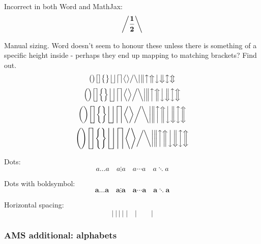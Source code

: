\documentclass[12pt,a4paper]{article}
\theoremstyle{clearprint}
\begin{document}
Incorrect in both Word and MathJax:
\begin{equation}
\boldsymbol{\left/ \frac{1}{2} \right\backslash} 
\end{equation}

Manual sizing. Word doesn't seem to honour these unless there is something of a specific height inside - perhaps they end up mapping to matching brackets? Find out.
\begin{equation}
\big( \big) \big[ \big] \big\{ \big\} \big\lfloor \big\rfloor \big\lceil \big\rceil \big\langle \big\rangle 
\big/ \big\backslash \big| \big\| \big\uparrow \big\Uparrow \big\downarrow \big\Downarrow \big\updownarrow \big\Updownarrow
\end{equation}
\begin{equation}
\Big( \Big) \Big[ \Big] \Big\{ \Big\} \Big\lfloor \Big\rfloor \Big\lceil \Big\rceil \Big\langle \Big\rangle 
\Big/ \Big\backslash \Big| \Big\| \Big\uparrow \Big\Uparrow \Big\downarrow \Big\Downarrow \Big\updownarrow \Big\Updownarrow
\end{equation}
\begin{equation}
\bigg( \bigg) \bigg[ \bigg] \bigg\{ \bigg\} \bigg\lfloor \bigg\rfloor \bigg\lceil \bigg\rceil \bigg\langle \bigg\rangle 
\bigg/ \bigg\backslash \bigg| \bigg\| \bigg\uparrow \bigg\Uparrow \bigg\downarrow \bigg\Downarrow \bigg\updownarrow \bigg\Updownarrow
\end{equation}
\begin{equation}
\Bigg( \Bigg) \Bigg[ \Bigg] \Bigg\{ \Bigg\} \Bigg\lfloor \Bigg\rfloor \Bigg\lceil \Bigg\rceil \Bigg\langle \Bigg\rangle 
\bigg/ \bigg\backslash \bigg| \bigg\| \bigg\uparrow \bigg\Uparrow \bigg\downarrow \bigg\Downarrow \bigg\updownarrow \bigg\Updownarrow
\end{equation}

\noindent 
Dots:
\begin{equation}
a \ldots a \quad a \vdots a \quad  a \cdots a \quad  a \ddots a
\end{equation}

\noindent 
Dots with boldsymbol:
\begin{equation}
\boldsymbol{a \ldots a \quad a \vdots a \quad  a \cdots a \quad  a \ddots a}
\end{equation}

\noindent 
Horizontal spacing:
\begin{equation}
|~|\,|\:|\;|\quad | \qquad |
\end{equation}

\subsubsection[AMS alphabets]{AMS additional: alphabets}
\end{document}
